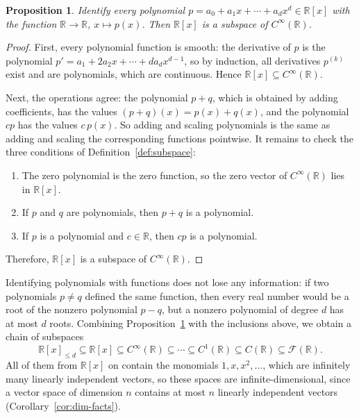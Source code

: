\documentclass[11pt]{article}
\theoremstyle{definition}
\theoremstyle{plain}
\newtheorem{proposition}[definition]{Proposition}
\theoremstyle{remark}
\begin{document}
\begin{proposition}\label{prop:poly-smooth}
    Identify every polynomial $p = a_0 + a_1x + \cdots + a_dx^d \in \mathbb{R}[x]$ with the function $\mathbb{R} \to \mathbb{R}$, $x \mapsto p(x)$. Then $\mathbb{R}[x]$ is a subspace of $C^\infty(\mathbb{R})$.
\end{proposition}

\begin{proof}
    First, every polynomial function is smooth: the derivative of $p$ is the polynomial $p' = a_1 + 2a_2x + \cdots + da_dx^{d-1}$, so by induction, all derivatives $p^{(k)}$ exist and are polynomials, which are continuous. Hence $\mathbb{R}[x] \subseteq C^\infty(\mathbb{R})$.

    Next, the operations agree: the polynomial $p + q$, which is obtained by adding coefficients, has the values $(p + q)(x) = p(x) + q(x)$, and the polynomial $cp$ has the values $c\,p(x)$. So adding and scaling polynomials is the same as adding and scaling the corresponding functions pointwise. It remains to check the three conditions of Definition~\ref{def:subspace}:
    \begin{enumerate}
        \item The zero polynomial is the zero function, so the zero vector of $C^\infty(\mathbb{R})$ lies in $\mathbb{R}[x]$.
        \item If $p$ and $q$ are polynomials, then $p + q$ is a polynomial.
        \item If $p$ is a polynomial and $c \in \mathbb{R}$, then $cp$ is a polynomial.
    \end{enumerate}
    Therefore, $\mathbb{R}[x]$ is a subspace of $C^\infty(\mathbb{R})$.
\end{proof}

Identifying polynomials with functions does not lose any information: if two polynomials $p \neq q$ defined the same function, then every real number would be a root of the nonzero polynomial $p - q$, but a nonzero polynomial of degree $d$ has at most $d$ roots. Combining Proposition~\ref{prop:poly-smooth} with the inclusions above, we obtain a chain of subspaces
\[\mathbb{R}[x]_{\leq d} \subseteq \mathbb{R}[x] \subseteq C^\infty(\mathbb{R}) \subseteq \cdots \subseteq C^1(\mathbb{R}) \subseteq C(\mathbb{R}) \subseteq \mathcal{F}(\mathbb{R}).\]
All of them from $\mathbb{R}[x]$ on contain the monomials $1, x, x^2, \ldots$, which are infinitely many linearly independent vectors, so these spaces are infinite-dimensional, since a vector space of dimension $n$ contains at most $n$ linearly independent vectors (Corollary~\ref{cor:dim-facts}).
\end{document}
